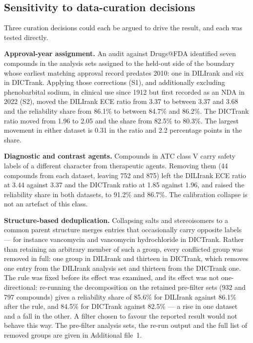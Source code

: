 \subsection{Sensitivity to data-curation decisions}

Three curation decisions could each be argued to drive the result, and each was
tested directly.

\textbf{Approval-year assignment.} An audit against Drugs@FDA identified seven
compounds in the analysis sets assigned to the held-out side of the boundary whose
earliest matching approval record predates 2010: one in DILIrank and six in
DICTrank. Applying those corrections (S1), and additionally excluding phenobarbital
sodium, in clinical use since 1912 but first recorded as an NDA in
2022 (S2), moved the DILIrank ECE ratio from 3.37 to between 3.37 and 3.68 and the
reliability share from 86.1\% to between 84.7\% and 86.2\%. The DICTrank ratio
moved from 1.96 to 2.05 and the share from 82.5\% to 80.3\%. The largest movement
in either dataset is 0.31 in the ratio and 2.2 percentage points in the share.

\textbf{Diagnostic and contrast agents.} Compounds in ATC class V carry safety
labels of a different character from therapeutic agents. Removing them (44
compounds from each dataset, leaving 752 and 875) left the DILIrank ECE ratio at
3.44 against 3.37 and the DICTrank ratio at 1.85 against 1.96, and raised the
reliability share in both datasets, to 91.2\% and 86.7\%. The calibration collapse
is not an artefact of this class.

\textbf{Structure-based deduplication.} Collapsing salts and stereoisomers to a
common parent structure merges entries that occasionally carry opposite labels ---
for instance vancomycin and vancomycin hydrochloride in DICTrank. Rather than
retaining an arbitrary member of such a group, every conflicted group was removed
in full: one group in DILIrank and thirteen in DICTrank, which removes one entry
from the DILIrank analysis set and thirteen from the DICTrank one.
The rule was fixed before its effect was examined, and its effect was not
one-directional: re-running the decomposition on the retained pre-filter sets
(932 and 797 compounds) gives a reliability share of 85.6\% for DILIrank against
86.1\% after the rule, and 84.5\% for DICTrank against 82.5\% --- a rise in one
dataset and a fall in the other. A filter chosen to favour the reported result
would not behave this way.
The pre-filter analysis sets, the re-run output and the full list of removed
groups are given in Additional file~1.

